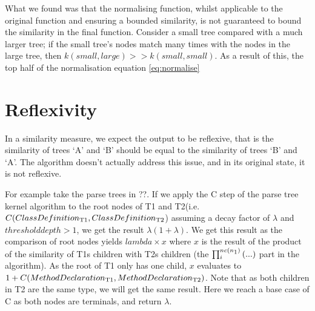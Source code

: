What we found was that the normalising function, whilst applicable to the original
function\cite{NLPKernel} and ensuring a bounded similarity, is not 
guaranteed to bound the similarity in the final function. Consider a small tree
compared with a much larger tree; if the small tree's nodes match many times with
the nodes in the large tree, then $k(small, large) >> k(small, small)$. As a result
of this, the top half of the normalisation equation \cref{eq:normalise}

\section{Reflexivity}
In a similarity measure, we expect the output to be reflexive, that is the similarity of trees `A' and `B' should be equal to the similarity of trees `B' and `A'. The algorithm doesn’t actually address this issue, and in its original state, it is not reflexive.

For example take the parse trees in ??. If we apply the C step of the parse tree kernel algorithm to the root nodes of T1 and T2(i.e. 
$C(ClassDefinition\textsubscript{T1},ClassDefinition\textsubscript{T2}$) assuming a decay factor of $\lambda$ and $threshold depth > 1$, we get the result $\lambda(1 + \lambda)$. 
We get this result as the comparison of root nodes yields 
$lambda \times x$ where $x$ is the result of the product of the similarity of T1s children
with T2s children (the $\prod_{i}^{nc(n\textsubscript{1})}{(...)}$ part in the algorithm). 
As the root of T1 only has one child, $x$ evaluates to
$1 + C(MethodDeclaration\textsubscript{T1}, MethodDeclaration\textsubscript{T2})$. Note that as both
children in T2 are the same type, we will get the same result. Here we reach
a base case of C as both nodes are terminals, and return $\lambda$.

